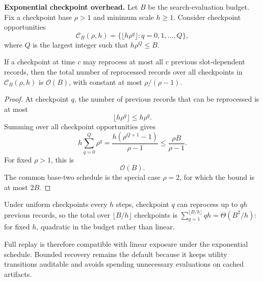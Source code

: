 \noindent\textbf{Exponential checkpoint overhead.}
Let \(B\) be the search-evaluation budget. Fix a checkpoint base \(\rho>1\) and minimum scale \(h\ge1\). Consider checkpoint opportunities
\[
\mathcal C_B(\rho,h)
=
\{\lfloor h\rho^q\rfloor : q=0,1,\ldots,Q\},
\]
where \(Q\) is the largest integer such that \(h\rho^Q\le B\).

\begin{proposition}
\label{prop:linear-work}
If a checkpoint at time \(c\) may reprocess at most all \(c\) previous slot-dependent records, then the total number of reprocessed records over all checkpoints in \(\mathcal C_B(\rho,h)\) is \(\mathcal{O}(B)\), with constant at most \(\rho/(\rho-1)\).
\end{proposition}

\begin{proof}
At checkpoint \(q\), the number of previous records that can be reprocessed is at most
\[
\lfloor h\rho^q\rfloor
\le
h\rho^q.
\]
Summing over all checkpoint opportunities gives
\[
h\sum_{q=0}^{Q}\rho^q
=
\frac{h(\rho^{Q+1}-1)}{\rho-1}
\le
\frac{\rho B}{\rho-1}.
\]
For fixed \(\rho>1\), this is
\[
\mathcal{O}(B).
\]
The common base-two schedule is the special case \(\rho=2\), for which the bound is at most \(2B\).
\end{proof}

\begin{remark}
\label{rem:dense-quadratic}
Under uniform checkpoints every \(h\) steps, checkpoint \(q\) can reprocess up to \(qh\) previous records, so the total over \(\lfloor B/h\rfloor\) checkpoints is \(\sum_{q=1}^{\lfloor B/h\rfloor} qh = \Theta(B^2/h)\): for fixed \(h\), quadratic in the budget rather than linear.
\end{remark}

Full replay is therefore compatible with linear exposure under the exponential schedule. Bounded recovery remains the default because it keeps utility transitions auditable and avoids spending unnecessary evaluations on cached artifacts.
